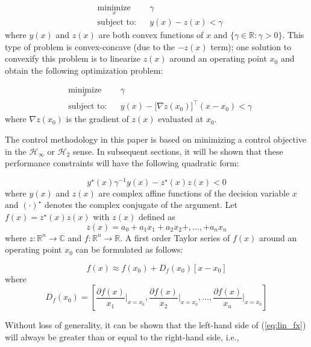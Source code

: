 \documentclass[a4paper, 10pt, conference]{ieeeconf}
\begin{document}
\begin{equation} \label{eq:con_cav}
\begin{aligned}
& \underset{ x }{\text{minimize}}
& & \gamma  \\
& \text{subject to:} & & y(x)-z(x) < \gamma 
\end{aligned}
\end{equation}
where $y(x)$ and $z(x)$ are both convex functions of $x$ and $\{ \gamma \in \mathbb{R} : \gamma > 0\}$. This type of problem is convex-concave (due to the $-z(x)$ term); one solution to convexify this problem is to linearize $z(x)$ around an operating point $x_0$ and obtain the following optimization problem:

\begin{equation} \label{eq:con_lin}
\begin{aligned}
& \underset{ x }{\text{minimize}}
& & \gamma  \\
& \text{subject to:} & & y(x)-\bigl[ \nabla z(x_0) \bigr]^{\top} (x-x_0) < \gamma 
\end{aligned}
\end{equation}
where $\nabla z(x_0)$ is the gradient of $z(x)$ evaluated at $x_0$. 
 
The control methodology in this paper is based on minimizing a control objective in the $\mathcal{H}_\infty$ or $\mathcal{H}_2$ sense. In subsequent sections, it will be shown that these performance constraints will have the following quadratic form:

\begin{equation} \label{eq:basic_ineq}
y^{\star}(x) \gamma^{-1} y(x) - z^{\star}(x)z(x) < 0 
\end{equation} 
where $y(x)$ and $z(x)$ are complex affine functions of the decision variable $x$ and $(\cdot)^{\star}$ denotes the complex conjugate of the argument. Let $f(x) = z^{\star}(x)z(x)$ with $z(x)$ defined as
$$z(x) = a_0 + a_1x_1 + a_2x_2 + ,\ldots , + a_nx_n$$
where $z:\mathbb{R}^n \rightarrow \mathbb{C}$ and $f:\mathbb{R}^n \rightarrow \mathbb{R}$. A first order Taylor series of $f(x)$ around an operating point $x_0$ can be formulated as follows:

\begin{equation} \label{eq:lin_fx}
f(x) \approx f(x_0) + D_f(x_0)[x-x_0]
\end{equation}
where
$$D_f(x_0) = \left[ \frac{\partial f(x)}{x_1}\Bigr|_{x=x_0}, \frac{\partial f(x)}{x_2}\Bigr|_{x=x_0},\ldots, \frac{\partial f(x)}{x_n}\Bigr|_{x=x_0}\right]$$

Without loss of generality, it can be shown that the left-hand side of (\ref{eq:lin_fx}) will always be greater than or equal to the right-hand side, i.e.,
\end{document}
